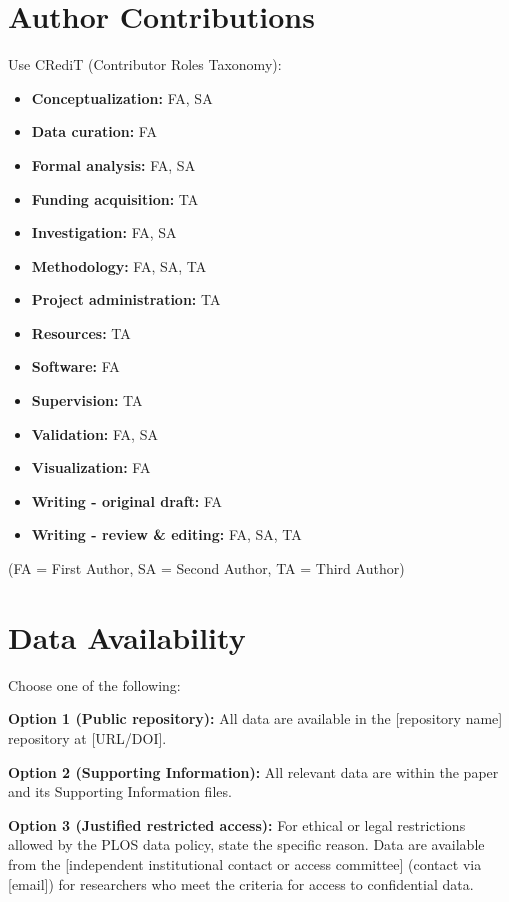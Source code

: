 \documentclass[10pt,letterpaper]{article}
\begin{document}
\section*{Author Contributions}

Use CRediT (Contributor Roles Taxonomy):
\begin{itemize}
    \item \textbf{Conceptualization:} FA, SA
    \item \textbf{Data curation:} FA
    \item \textbf{Formal analysis:} FA, SA
    \item \textbf{Funding acquisition:} TA
    \item \textbf{Investigation:} FA, SA
    \item \textbf{Methodology:} FA, SA, TA
    \item \textbf{Project administration:} TA
    \item \textbf{Resources:} TA
    \item \textbf{Software:} FA
    \item \textbf{Supervision:} TA
    \item \textbf{Validation:} FA, SA
    \item \textbf{Visualization:} FA
    \item \textbf{Writing - original draft:} FA
    \item \textbf{Writing - review \& editing:} FA, SA, TA
\end{itemize}

(FA = First Author, SA = Second Author, TA = Third Author)

\section*{Data Availability}

Choose one of the following:

\textbf{Option 1 (Public repository):} 
All data are available in the [repository name] repository at [URL/DOI].

\textbf{Option 2 (Supporting Information):}
All relevant data are within the paper and its Supporting Information files.

\textbf{Option 3 (Justified restricted access):}
For ethical or legal restrictions allowed by the PLOS data policy, state the specific reason. Data are available from the [independent institutional contact or access committee] (contact via [email]) for researchers who meet the criteria for access to confidential data.
\end{document}
